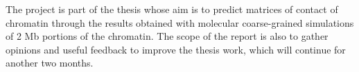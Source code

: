 The project is part of the thesis whose aim is to predict matrices of contact of chromatin through the results obtained with molecular coarse-grained simulations of 2 Mb portions of the chromatin.
The scope of the report is also to gather opinions and useful feedback to improve the thesis work, which will continue for another two months.